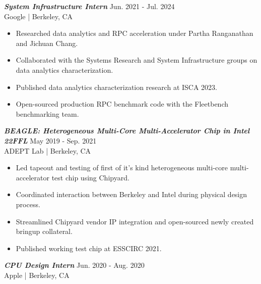 \documentclass[letter]{res}
\begin{document}
\begin{resume}
\vspace{-2.5mm}

{\sl \textbf{System Infrastructure Intern}} \hfill Jun. 2021 - Jul. 2024\\
Google | Berkeley, CA \newline

 \vspace{-4mm}

 \begin{itemize}
 \item Researched data analytics and RPC acceleration under Partha Ranganathan and Jichuan Chang.
 \item Collaborated with the Systems Research and System Infrastructure groups on data analytics characterization.
 \item Published data analytics characterization research at ISCA 2023.
 \item Open-sourced production RPC benchmark code with the Fleetbench benchmarking team.
 \end{itemize}

\vspace{-2.5mm}

{\sl \textbf{BEAGLE: Heterogeneous Multi-Core Multi-Accelerator Chip in Intel 22FFL}} \hfill May 2019 - Sep. 2021\\
ADEPT Lab | Berkeley, CA \newline

 \vspace{-4mm}

 \begin{itemize}
 \item Led tapeout and testing of first of it's kind heterogeneous multi-core multi-accelerator test chip using Chipyard.
 \item Coordinated interaction between Berkeley and Intel during physical design process.
 \item Streamlined Chipyard vendor IP integration and open-sourced newly created bringup collateral.
 \item Published working test chip at ESSCIRC 2021.
 \end{itemize}

\vspace{-2.5mm}

{\sl \textbf{CPU Design Intern}} \hfill Jun. 2020 - Aug. 2020\\
Apple | Berkeley, CA \newline

 \vspace{-4mm}


\end{resume}
\end{document}
